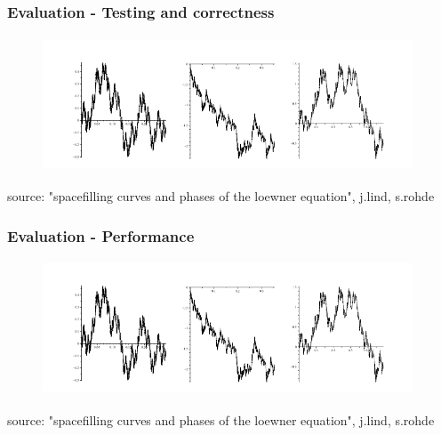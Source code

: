 \documentclass[10pt, compress]{beamer}
\begin{document}
\begin{frame}[fragile]
  \frametitle{Evaluation - Testing and correctness}

  


\begin{figure}
  \centering
 \includegraphics[width=11cm,height=4cm]{intro2.png}
\end{figure}
\tiny
source: "spacefilling curves and phases of the loewner equation", j.lind, s.rohde
\normalsize
\end{frame}


\begin{frame}[fragile]
  \frametitle{Evaluation - Performance}






\begin{figure}
  \centering
 \includegraphics[width=11cm,height=4cm]{intro2.png}
\end{figure}
\tiny
source: "spacefilling curves and phases of the loewner equation", j.lind, s.rohde
\normalsize
\end{frame}
\end{document}
